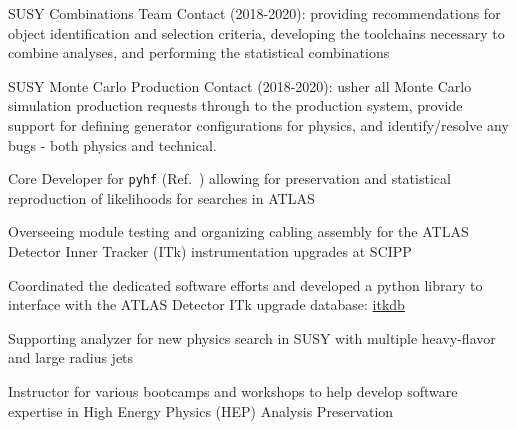 \documentclass[margin,line]{resume}
\begin{document}
\begin{resume}
\begin{list2}
  \item SUSY Combinations Team Contact (2018-2020): providing recommendations for object identification and selection criteria, developing the toolchains necessary to combine analyses, and performing the statistical combinations
  \item SUSY Monte Carlo Production Contact (2018-2020): usher all Monte Carlo simulation production requests through to the production system, provide support for defining generator configurations for physics, and identify/resolve any bugs - both physics and technical.
  \item Core Developer for \texttt{pyhf} (Ref.~\cite{ATL-PHYS-PUB-2019-029}) allowing for preservation and statistical reproduction of likelihoods for searches in ATLAS
  \item Overseeing module testing and organizing cabling assembly for the ATLAS Detector Inner Tracker (ITk) instrumentation upgrades at SCIPP
  \item Coordinated the dedicated software efforts and developed a python library to interface with the ATLAS Detector ITk upgrade database: \href{https://pypi.org/project/itkdb/}{itkdb}
  \item Supporting analyzer for new physics search in SUSY with multiple heavy-flavor and large radius jets \cite{SUSY-2016-10, SUSY-2015-10, ATLAS-CONF-2017-021, ATLAS-CONF-2016-052, ATLAS-CONF-2015-067}
  \item Instructor for various bootcamps and workshops to help develop software expertise in High Energy Physics (HEP) Analysis Preservation~\cite{AwesomeFeb2020,USATLASBootcamp2019}
\end{list2}

\newpage



\end{resume}
\end{document}
